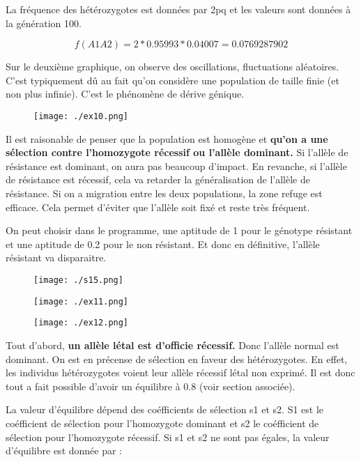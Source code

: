\documentclass{article}
\begin{document}
La fréquence des hétérozygotes est données par 2pq et les valeurs sont données à la génération 100.

\begin{equation}
f(A1A2) = 2 * 0.95993 * 0.04007 = 0.0769287902
\end{equation}

Sur le deuxième graphique, on observe des oscillations, fluctuations aléatoires. C'est typiquement dû au fait qu'on considère une population de taille finie (et non plus infinie). C'est le phénomène de dérive génique.

\begin{figure}[H]
\texttt{[image: ./ex10.png]}
\end{figure}

Il est raisonable de penser que la population est homogène et \textbf{qu'on a une sélection contre l'homozygote récessif ou l'allèle dominant.} Si l'allèle de résistance est dominant, on aura pas beaucoup d'impact. En revanche, si l'allèle de résistance est récessif, cela va retarder la généralisation de l'allèle de résistance. Si on a migration entre les deux populations, la zone refuge est efficace. Cela permet d'éviter que l'allèle soit fixé et reste très fréquent.

On peut choisir dans le programme, une aptitude de 1 pour le génotype résistant et une aptitude de 0.2 pour le non résistant. Et donc en définitive, l'allèle résistant va disparaitre.

\begin{figure}[H]
\texttt{[image: ./s15.png]}
\end{figure}

\begin{figure}[H]
\texttt{[image: ./ex11.png]}
\end{figure}

\begin{figure}[H]
\texttt{[image: ./ex12.png]}
\end{figure}

Tout d'abord, \textbf{un allèle létal est d'officie récessif.} Donc l'allèle normal est dominant.
On est en précense de sélection en faveur des hétérozygotes. En effet, les individus hétérozygotes voient leur allèle récessif létal non exprimé. Il est donc tout a fait possible d'avoir un équilibre à 0.8 (voir section associée).

La valeur d'équilibre dépend des coéfficients de sélection s1 et s2. S1 est le coéfficient de sélection pour l'homozygote dominant et s2 le coéfficient de sélection pour l'homozygote récessif. Si s1 et s2 ne sont pas égales, la valeur d'équilibre est donnée par :
\end{document}
